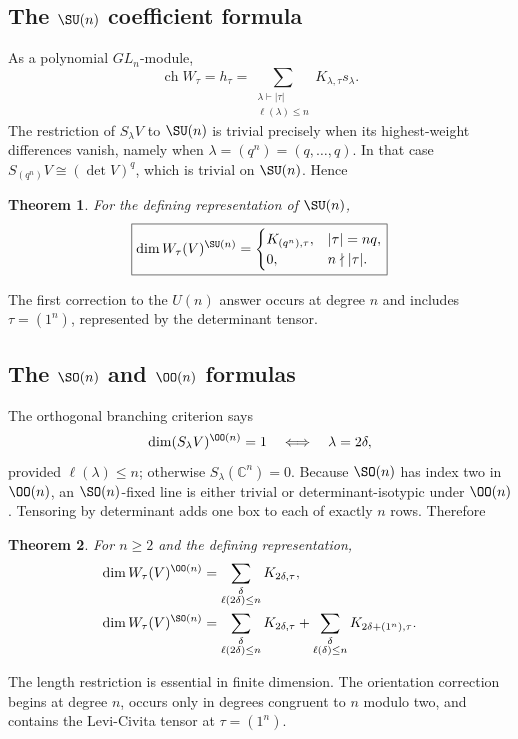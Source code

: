 \documentclass[10pt]{article}
\newtheorem{theorem}{Theorem}
\begin{document}
\subsection{The $\SU(n)$ coefficient formula}
As a polynomial $GL_n$-module,
\[
 \operatorname{ch}W_\tau=h_\tau
 =\sum_{\substack{\lambda\vdash |\tau|\\\ell(\lambda)\le n}}
 K_{\lambda,\tau}s_\lambda.
\]
The restriction of $S_\lambda V$ to $\SU(n)$ is trivial precisely when its
highest-weight differences vanish, namely when
$\lambda=(q^n)=(q,\ldots,q)$.  In that case
$S_{(q^n)}V\cong (\det V)^q$, which is trivial on $\SU(n)$.  Hence
\begin{theorem}
For the defining representation of $\SU(n)$,
\[
 \boxed{\dim W_\tau(V)^{\SU(n)}=
 \begin{cases}
 K_{(q^n),\tau},&|\tau|=nq,\\
 0,&n\nmid |\tau|.
 \end{cases}}
\]
\end{theorem}
The first correction to the $U(n)$ answer occurs at degree $n$ and includes
$\tau=(1^n)$, represented by the determinant tensor.

\subsection{The $\SO(n)$ and $\OO(n)$ formulas}
The orthogonal branching criterion says
\[
 \dim(S_\lambda V)^{\OO(n)}=1
 \quad\Longleftrightarrow\quad
 \lambda=2\delta,
\]
provided $\ell(\lambda)\le n$; otherwise $S_\lambda(\mathbb C^n)=0$.
Because $\SO(n)$ has index two in $\OO(n)$, an $\SO(n)$-fixed line is either
trivial or determinant-isotypic under $\OO(n)$.  Tensoring by determinant adds
one box to each of exactly $n$ rows.  Therefore
\begin{theorem}
For $n\ge2$ and the defining representation,
\begin{align*}
 \dim W_\tau(V)^{\OO(n)}
 &=\sum_{\substack{\delta\\\ell(2\delta)\le n}}K_{2\delta,\tau},\\
 \dim W_\tau(V)^{\SO(n)}
 &=\sum_{\substack{\delta\\\ell(2\delta)\le n}}K_{2\delta,\tau}
 +\sum_{\substack{\delta\\\ell(\delta)\le n}}
 K_{2\delta+(1^n),\tau}.
\end{align*}
\end{theorem}
The length restriction is essential in finite dimension.  The orientation
correction begins at degree $n$, occurs only in degrees congruent to $n$ modulo
two, and contains the Levi-Civita tensor at $\tau=(1^n)$.
\end{document}
